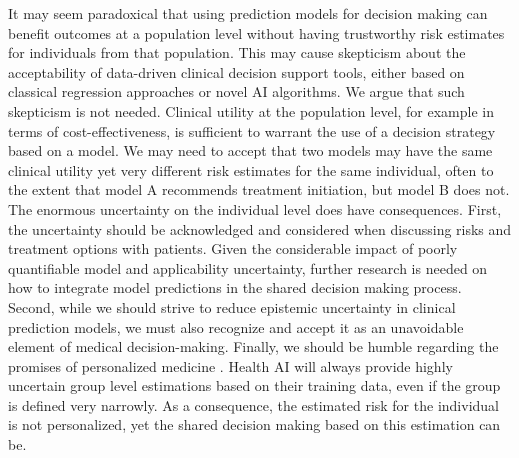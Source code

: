 It may seem paradoxical that using prediction models for decision making can benefit outcomes at a population level without having trustworthy risk estimates for individuals from that population. This may cause skepticism about the acceptability of data-driven clinical decision support tools, either based on classical regression approaches or novel AI algorithms. We argue that such skepticism is not needed. Clinical utility at the population level, for example in terms of cost-effectiveness, is sufficient to warrant the use of a decision strategy based on a model. We may need to accept that two models may have the same clinical utility yet very different risk estimates for the same individual, often to the extent that model A recommends treatment initiation, but model B does not. The enormous uncertainty on the individual level does have consequences. First, the uncertainty should be acknowledged and considered when discussing risks and treatment options with patients. Given the considerable impact of poorly quantifiable model and applicability uncertainty, further research is needed on how to integrate model predictions in the shared decision making process. Second, while we should strive to reduce epistemic uncertainty in clinical prediction models, we must also recognize and accept it as an unavoidable element of medical decision-making. Finally, we should be humble regarding the promises of personalized medicine \cite{sennStatisticalPitfallsPersonalized2018}. Health AI will always provide highly uncertain group level estimations based on their training data, even if the group is defined very narrowly. As a consequence, the estimated risk for the individual is not personalized, yet the shared decision making based on this estimation can be. 

